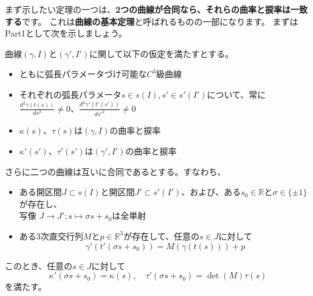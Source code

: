 まず示したい定理の一つは、\textbf{2つの曲線が合同なら、それらの曲率と捩率は一致する}です。
これは\textbf{曲線の基本定理}と呼ばれるものの一部になります。
まずはPart1として次を示しましょう。
\begin{theorem}
  曲線$(\gamma,I)$と$(\gamma',I')$に関して以下の仮定を満たすとする。
  \begin{itemize}
    \item ともに弧長パラメータづけ可能な$C^3$級曲線
    \item それぞれの弧長パラメータ$s\in s(I),s'\in s'(I')$について、常に$\frac{d^2\gamma(t(s))}{ds^2}\neq0$、$\frac{d^2\gamma'(t'(s'))}{ds'^2}\neq0$
    \item $\kappa(s)$、$\tau(s)$は$(\gamma,I)$の曲率と捩率
    \item $\kappa'(s')$、$\tau'(s')$は$(\gamma',I')$の曲率と捩率
  \end{itemize}
  さらに二つの曲線は互いに合同であるとする。すなわち、
  \begin{itemize}
    \item ある開区間$J\subset s(I)$と開区間$J'\subset s'(I')$、および、ある$s_0\in\mathbb{R}$と$\sigma\in\{\pm1\}$が存在し、\\
    写像 $J\to J';s\mapsto\sigma s+s_0$は全単射
    \item ある3次直交行列$M$と$p\in\mathbb{R}^3$が存在して、任意の$s\in J$に対して
    \[
      \gamma'(t'(\sigma s+s_0)) = M(\gamma(t(s))) + p
    \]
  \end{itemize}
  このとき、任意の$s\in J$に対して
  \[
    \kappa'(\sigma s+s_0)=\kappa(s),\quad\tau'(\sigma s+s_0)=\det(M)\tau(s)
  \]
  を満たす。
\end{theorem}
